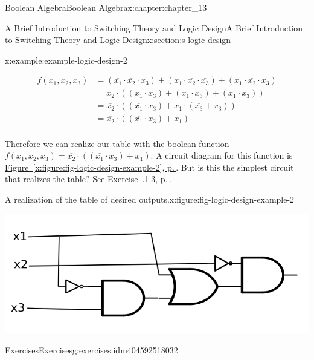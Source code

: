 \documentclass[twoside,10pt,]{book}
\newcommand{\xreffont}{\relax}
\numberwithin{equation}{section}
\begin{document}
\begin{chapterptx}{Boolean Algebra}{}{Boolean Algebra}{}{}{x:chapter:chapter_13}
\begin{sectionptx}{A Brief Introduction to Switching Theory and Logic Design}{}{A Brief Introduction to Switching Theory and Logic Design}{}{}{x:section:s-logic-design}
\begin{example}{}{x:example:example-logic-design-2}
\par
%
\begin{equation*}
\begin{split}
f\left(x_1, x_2, x_3\right)&= (\overline{x_1} \cdot  \overline{x_2} \cdot  x_3) + (x_1 \cdot  \overline{x_2} \cdot   \overline{x_3})+(x_1  \cdot   \overline{x_2} \cdot x_3)\\
&= \overline{x_2} \cdot( (\overline{x_1} \cdot   x_3) + (x_1 \cdot \overline{x_3})+(x_1 \cdot x_3))\\
&= \overline{x_2} \cdot( (\overline{x_1} \cdot   x_3) + x_1 \cdot (\overline{x_3}+ x_3))\\
&= \overline{x_2} \cdot ((\overline{x_1} \cdot   x_3) + x_1)\\
\end{split}
\end{equation*}
%
\par
Therefore we can realize our table with the boolean function \(f\left(x_1, x_2, x_3\right)=\overline{x_2} \cdot ((\overline{x_1} \cdot   x_3) + x_1)\). A circuit  diagram for this function is \hyperref[x:figure:fig-logic-design-example-2]{Figure~{\xreffont\ref{x:figure:fig-logic-design-example-2}}, p.\,\pageref{x:figure:fig-logic-design-example-2}}.  But is this the simplest circuit that realizes the table?  See \hyperlink{x:exercise:exerc-simpler-circuit}{Exercise~{\xreffont 13.7.1.3}, p.\,\pageref{x:exercise:exerc-simpler-circuit}}.%
\begin{figureptx}{A realization of the table of desired outputs.}{x:figure:fig-logic-design-example-2}{}%
\begin{image}{0.2}{0.6}{0.2}%
\includegraphics[width=\linewidth]{images/fig-logic-design-example-2.png}
\end{image}%
\tcblower
\end{figureptx}%
\end{example}
%
%
\typeout{************************************************}
\typeout{************************************************}
%
\begin{exercises-subsection}{Exercises}{}{Exercises}{}{}{g:exercises:idm404592518032}

\end{exercises-subsection}
\end{sectionptx}
\end{chapterptx}
\end{document}
